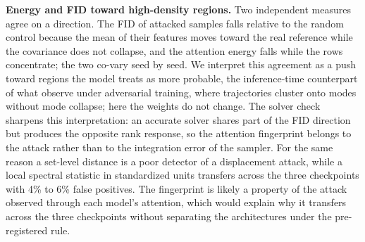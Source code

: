 \documentclass{article}
\begin{document}
\textbf{Energy and FID toward high-density regions.} Two independent measures agree on a direction. The FID of attacked samples falls relative to the random control because the mean of their features moves toward the real reference while the covariance does not collapse, and the attention energy falls while the rows concentrate; the two co-vary seed by seed. We interpret this agreement as a push toward regions the model treats as more probable, the inference-time counterpart of what \citet{briglia2025adversarial} observe under adversarial training, where trajectories cluster onto modes without mode collapse; here the weights do not change. The solver check sharpens this interpretation: an accurate solver shares part of the FID direction but produces the opposite rank response, so the attention fingerprint belongs to the attack rather than to the integration error of the sampler. For the same reason a set-level distance is a poor detector of a displacement attack, while a local spectral statistic in standardized units transfers across the three checkpoints with 4\% to 6\% false positives. The fingerprint is likely a property of the attack observed through each model's attention, which would explain why it transfers across the three checkpoints without separating the architectures under the pre-registered rule.
\end{document}
